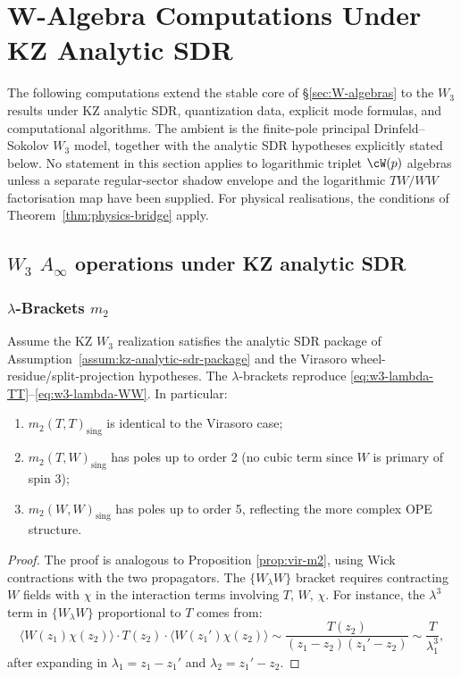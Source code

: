\section{W-Algebra Computations Under KZ Analytic SDR}

The following computations extend the stable core of
\S\ref{sec:W-algebras} to the $W_3$ results under KZ analytic SDR,
quantization data, explicit mode formulas, and computational algorithms.
The ambient is the finite-pole principal Drinfeld--Sokolov $W_3$
model, together with the analytic SDR hypotheses explicitly stated
below. No statement in this section applies to logarithmic triplet
$\cW(p)$ algebras unless a separate regular-sector shadow envelope and
the logarithmic $TW/WW$ factorisation map have been supplied. For
physical realisations, the conditions of Theorem~\ref{thm:physics-bridge}
apply.


\subsection{$W_3$ $A_\infty$ operations under KZ analytic SDR}

\subsubsection{$\lambda$-Brackets $m_2$}

\begin{proposition}
Assume the KZ $W_3$ realization satisfies the analytic SDR package of
Assumption~\textup{\ref{assum:kz-analytic-sdr-package}} and the
Virasoro wheel-residue/split-projection hypotheses.
The $\lambda$-brackets reproduce \eqref{eq:w3-lambda-TT}--\eqref{eq:w3-lambda-WW}. In particular:
\begin{enumerate}
\item $m_2(T,T)_{\text{sing}}$ is identical to the Virasoro case;
\item $m_2(T,W)_{\text{sing}}$ has poles up to order 2 (no cubic term since $W$ is primary of spin 3);
\item $m_2(W,W)_{\text{sing}}$ has poles up to order 5, reflecting the more complex OPE structure.
\end{enumerate}
\end{proposition}

\begin{proof}
The proof is analogous to Proposition \ref{prop:vir-m2}, using Wick contractions with the two propagators. The $\{W_\lambda W\}$ bracket requires contracting $W$ fields with $\chi$ in the interaction terms involving $T$, $W$, $\chi$. For instance, the $\lambda^3$ term in $\{W_\lambda W\}$ proportional to $T$ comes from:
\[
\langle W(z_1) \chi(z_2) \rangle \cdot T(z_2) \cdot \langle W(z_1') \chi(z_2) \rangle \sim \frac{T(z_2)}{(z_1-z_2)(z_1'-z_2)} \sim \frac{T}{\lambda_1^3},
\]
after expanding in $\lambda_1 = z_1 - z_1'$ and $\lambda_2 = z_1' - z_2$.
\end{proof}

